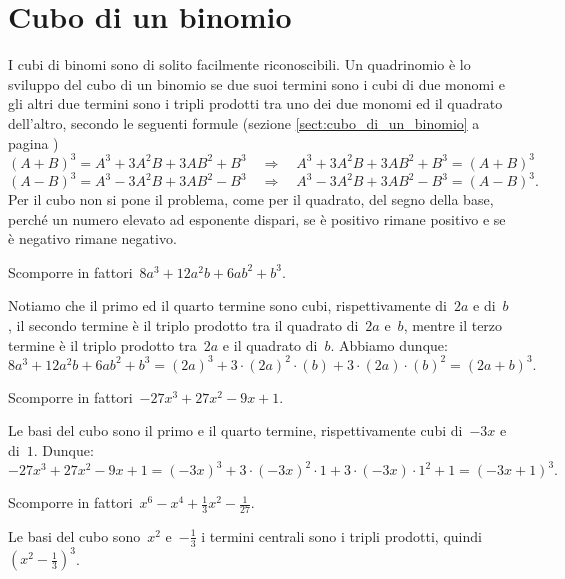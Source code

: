 \section{Cubo di un binomio}
I cubi di binomi sono di solito facilmente riconoscibili. Un quadrinomio è lo sviluppo del cubo di un binomio se due suoi termini sono i cubi
di due monomi e gli altri due termini sono i tripli prodotti tra uno dei due monomi ed il quadrato dell’altro, secondo le seguenti formule (sezione \ref{sect:cubo_di_un_binomio} a pagina \pageref{sect:cubo_di_un_binomio})
\begin{equation*}
(A+B)^{3}=A^{3}+3A^{2}B+3AB^{2}+B^{3}\quad \Rightarrow \quad A^{3}+3A^{2}B+3AB^{2}+B^{3}=(A+B)^{3}\phantom{.}
\end{equation*}
\begin{equation*}
(A-B)^{3}=A^{3}-3A^{2}B+3AB^{2}-B^{3}\quad \Rightarrow \quad A^{3}-3A^{2}B+3AB^{2}-B^{3}=(A-B)^{3}.
\end{equation*}
Per il cubo non si pone il problema, come per il quadrato, del segno della base, perché un numero elevato ad esponente dispari,
se è positivo rimane positivo e se è negativo rimane negativo.

\begin{exrig}
 \begin{esempio}
Scomporre in fattori~$8a^{3}+12a^{2}b+6{ab}^{2}+b^{3}$.

Notiamo che il primo ed il quarto termine sono cubi, rispettivamente di~$2a$ e di~$b$, il secondo termine è il triplo
prodotto tra il quadrato di~$2a$ e~$b$, mentre il terzo termine è il triplo prodotto tra~$2a$ e il quadrato di~$b$.
Abbiamo dunque:
\[8a^{3}+12a^{2}b+6ab^{2}+b^{3}=(2a)^{3}+3\cdot (2a)^{2}\cdot (b)+3\cdot (2a)\cdot (b)^{2}=(2a+b)^{3}.\]
 \end{esempio}

 \begin{esempio}
Scomporre in fattori~$-27x^{3}+27x^{2}-9x+1$.

Le basi del cubo sono il primo e il quarto termine, rispettivamente cubi di~$-3x$ e di~$1$.
Dunque:
\[-27x^{3}+27x^{2}-9x+1=(-3x)^{3}+3\cdot (-3x)^{2}\cdot 1+3\cdot (-3x)\cdot 1^{2}+1=(-3x+1)^{3}.\]
 \end{esempio}

 \begin{esempio}
Scomporre in fattori~$x^{6}-x^{4}+\frac{1}{3}x^{2}-\frac{1}{27}$.

Le basi del cubo sono~$x^{2}$ e~$-\frac{1}{3}$ i termini centrali sono i tripli prodotti,
quindi~$\left(x^{2}-\frac{1}{3}\right)^{3}$.
\end{esempio}
\end{exrig}
\ovalbox{\risolvii \ref{ese:16.20}, \ref{ese:16.21}, \ref{ese:16.22}, \ref{ese:16.23}, \ref{ese:16.24},\ref{ese:16.25}, \ref{ese:16.26}, \ref{ese:16.27}, \ref{ese:16.28}}

